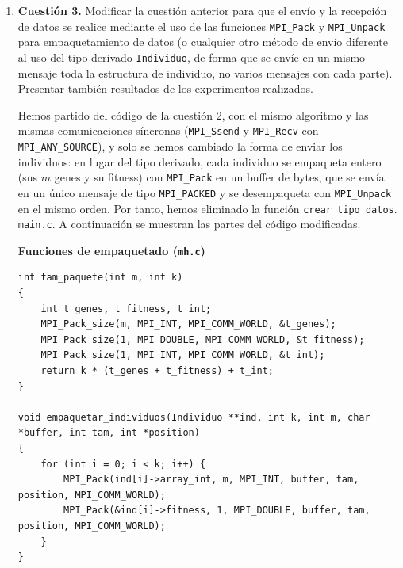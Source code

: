 \documentclass[12pt]{article}
\begin{document}
\begin{enumerate}
Por tanto, en esta máquina los valores más razonables son 2 o 4 procesos.


\newpage
\item \textbf{Cuestión 3.} Modificar la cuestión anterior para que el envío y la recepción de datos se realice mediante el uso de las funciones \texttt{MPI\_Pack} y \texttt{MPI\_Unpack} para empaquetamiento de datos (o cualquier otro método de envío diferente al uso del tipo derivado \texttt{Individuo}, de forma que se envíe en un mismo mensaje toda la estructura de individuo, no varios mensajes con cada parte). Presentar también resultados de los experimentos realizados.


Hemos partido del código de la cuestión 2, con el mismo algoritmo y las mismas comunicaciones síncronas (\texttt{MPI\_Ssend} y \texttt{MPI\_Recv} con \texttt{MPI\_ANY\_SOURCE}), y solo se hemos cambiado la forma de enviar los individuos: en lugar del tipo derivado, cada individuo se empaqueta entero (sus $m$ genes y su fitness) con \texttt{MPI\_Pack} en un buffer de bytes, que se envía en un único mensaje de tipo \texttt{MPI\_PACKED} y se desempaqueta con \texttt{MPI\_Unpack} en el mismo orden. Por tanto, hemos eliminado la función \texttt{crear\_tipo\_datos}. \texttt{main.c}. A continuación se muestran las partes del código modificadas.


\medskip
\noindent\textbf{Funciones de empaquetado (\texttt{mh.c})}\par
\smallskip

\begin{lstlisting}[style=EstiloC]
int tam_paquete(int m, int k)
{
	int t_genes, t_fitness, t_int;
	MPI_Pack_size(m, MPI_INT, MPI_COMM_WORLD, &t_genes);
	MPI_Pack_size(1, MPI_DOUBLE, MPI_COMM_WORLD, &t_fitness);
	MPI_Pack_size(1, MPI_INT, MPI_COMM_WORLD, &t_int);
	return k * (t_genes + t_fitness) + t_int;
}

void empaquetar_individuos(Individuo **ind, int k, int m, char *buffer, int tam, int *position)
{
	for (int i = 0; i < k; i++) {
		MPI_Pack(ind[i]->array_int, m, MPI_INT, buffer, tam, position, MPI_COMM_WORLD);
		MPI_Pack(&ind[i]->fitness, 1, MPI_DOUBLE, buffer, tam, position, MPI_COMM_WORLD);
	}
}


\end{lstlisting}
\end{enumerate}
\end{document}
